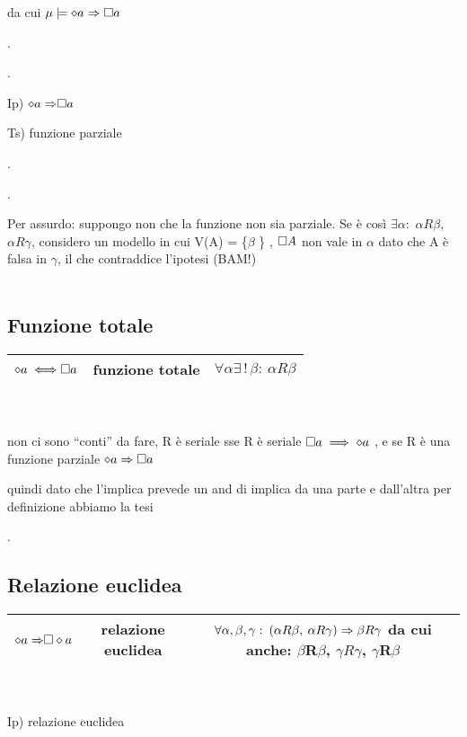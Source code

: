 da cui $\mu\models\diamond a\Rightarrow\square a$

.

.

Ip) $\diamond{a\Rightarrow}\square a$

Ts) funzione parziale

.

.

Per assurdo: suppongo non che la funzione non sia parziale. Se è così
$\exists\alpha:$ $\alpha R\beta,$ $\alpha R\gamma$, considero un
modello in cui V(A) = \{$\beta$ \} , $\square A$ non vale in $\alpha$
dato che A è falsa in $\gamma$, il che contraddice l'ipotesi (BAM!)\\
 \\
 


\subsection{Funzione totale}

\begin{tabular}{|c|c|c|}
\hline 
$\diamond{a\iff}\square a$  & funzione totale  & $\forall\alpha\exists\,!\,\beta:\:\alpha R\beta$ \tabularnewline
\hline 
\end{tabular}\\
 \\


non ci sono ``conti'' da fare, R è seriale sse R è seriale $\square a\implies\diamond a$
, e se R è una funzione parziale $\diamond a\Rightarrow\square a$

quindi dato che l'implica prevede un and di implica da una parte e
dall'altra per definizione abbiamo la tesi

.


\subsection{Relazione euclidea}

\begin{tabular}{|c|c|c|}
\hline 
$\diamond{a\Rightarrow}\square\diamond a$  & relazione euclidea  & $\forall\alpha,\beta,\gamma:\:(\alpha R\beta,\:\alpha R\gamma)\Rightarrow\beta R\gamma$
da cui anche: $\beta$R$\beta$, $\gamma R\gamma$, $\gamma$R$\beta$\tabularnewline
\hline 
\end{tabular}\\
 \\


Ip) relazione euclidea

